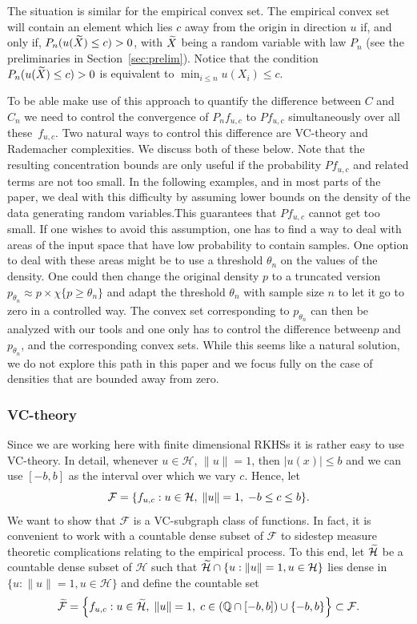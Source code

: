 \documentclass[AHL,Unicode,longabstracts,published]{cedram}
\theoremstyle{remark}
\newcommand{\bbQ}{\mathbb{Q}}
\newcommand{\cH}{\mathcal{H}}
\newcommand{\clF}{\mathcal{F}}
\let\oldtilde\tilde
\renewcommand*{\tilde}[1]{\mathchoice{\widetilde{#1}}{\widetilde{#1}}{\oldtilde{#1}}{\oldtilde{#1}}}
\let\originalleft\left
\let\originalright\right
\renewcommand{\left}{\mathopen{}\mathclose\bgroup\originalleft}
\renewcommand{\right}{\aftergroup\egroup\originalright}
\newcounter{setofstep}
\newcounter{step}[setofstep]
\begin{document}
The situation is similar for the empirical convex set. The empirical convex set will contain an element which lies $c$ away from the origin in direction $u$ if, and only if, $P_n(u(\tilde X) \leq c) >0$, with $\tilde X$ being a random variable with law $P_n$ (see the preliminaries in Section~\ref{sec:prelim}). Notice that the condition $P_n(u(\tilde X) \leq c) >0$ is equivalent to $\min_{i\leq n} u(X_i) \leq c$.

To be able make use of this approach to quantify the difference between $C$ and $C_n$ we need to control the convergence of $P_n f_{u,c}$ to $P f_{u,c}$ simultaneously over all these~$f_{u,c}$. Two natural ways to control this difference are VC-theory and Rademacher complexities. We discuss both of these below. Note that the resulting concentration bounds are only useful if the probability $P f_{u,c}$ and related terms are not too small. In the following examples, and in most parts of the paper, we deal with this difficulty by assuming lower bounds on the density of the data generating random variables.\linebreak This guarantees that $P f_{u,c}$ cannot get too small. If one wishes to avoid this assumption, one has to find a way to deal with areas of the input space that have low probability to contain samples. One option to deal with these areas might be to use a threshold $\theta_n$ on the values of the density. One could then change the original density $p$ to a truncated version $p_{\theta_n} \approx p \times \chi\{p \geq \theta_n\}$ and adapt the threshold $\theta_n$ with sample size $n$ to let it go to zero in a controlled way. The convex set corresponding to $p_{\theta_n}$ can then be analyzed with our tools and one only has to control the difference between\linebreak $p$ and $p_{\theta_n}$, and the corresponding convex sets. While this seems like a natural solution, we do not explore this path in this paper and we focus fully on the case of densities that are bounded away from zero.



\subsubsection{VC-theory}
Since we are working here with finite dimensional RKHSs it is rather easy to use VC-theory. In detail, whenever $u \in \cH$, $\|u\| = 1$, then $|u(x)| \leq b$ and we can use $[-b,b]$ as the interval over which we vary $c$. Hence, let
\[
\clF = \left\{f_{u,c} : u \in \cH,\; \|u\|=1, \;-b \leq c \leq b \right \}.
\]
We want to show that $\clF$ is a VC-subgraph class of functions. In fact, it is convenient to work with a countable dense subset of $\clF$ to sidestep measure theoretic complications relating to the empirical process. To this end, let $\tilde{\cH}$ be a countable dense subset of $\cH$ such that $\tilde{\cH} \cap \{u : \|u\|=1,u\in \cH\}$ lies dense in $\{u : \|u\|=1,u \in \cH\}$ and define the countable set
\begin{equation}\label{eq:countableF}
\tilde{\clF} = \left\{f_{u,c} : u \in \tilde{\cH},\; \|u\|=1,\; c \in (\bbQ \cap [-b,b]) \cup \{-b,b\}\right\} \subset \clF.
\end{equation}
\end{document}
